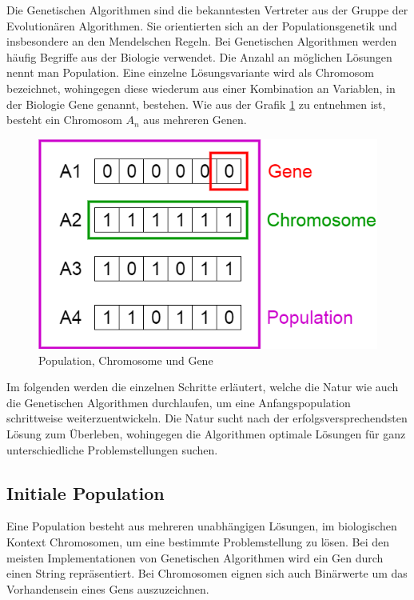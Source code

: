 Die Genetischen Algorithmen sind die bekanntesten Vertreter aus der Gruppe der Evolutionären
Algorithmen. Sie orientierten sich an der Populationsgenetik und insbesondere an den Mendelschen
Regeln. \cite{Mcc00}
Bei Genetischen Algorithmen werden häufig Begriffe aus der Biologie verwendet. Die Anzahl an
möglichen Lösungen nennt man Population. Eine einzelne Lösungsvariante wird als Chromosom
bezeichnet, wohingegen diese wiederum aus einer Kombination an Variablen, in der Biologie Gene
genannt, bestehen. Wie aus der Grafik \ref{fig:genetics} zu entnehmen ist, besteht ein Chromosom
$A_n$ aus mehreren Genen.
\\
\begin{figure}[h!]
  \centering
  \includegraphics[scale=0.6]{resources/genetic_algorithms.png}
  \caption{Population, Chromosome und Gene}
  \label{fig:genetics}
\end{figure}

Im folgenden werden die einzelnen Schritte erläutert, welche die Natur wie auch die Genetischen
Algorithmen durchlaufen, um eine Anfangspopulation schrittweise weiterzuentwickeln. Die Natur
sucht nach der erfolgsversprechendsten Lösung zum Überleben, wohingegen die Algorithmen
optimale Lösungen für ganz unterschiedliche Problemstellungen suchen. \cite{Mal17}

\subsection{Initiale Population}
Eine Population besteht aus mehreren unabhängigen Lösungen, im biologischen Kontext Chromosomen,
um eine bestimmte Problemstellung zu lösen. Bei den meisten Implementationen von Genetischen
Algorithmen wird ein Gen durch einen String repräsentiert. Bei Chromosomen eignen sich auch
Binärwerte um das Vorhandensein eines Gens auszuzeichnen.

